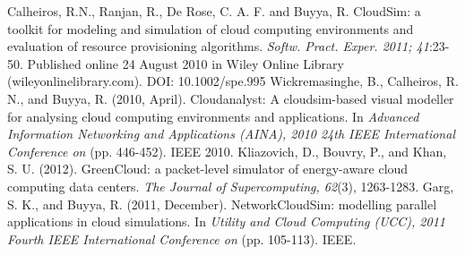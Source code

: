 \documentclass[times, 10pt,twocolumn]{article}
\begin{document}
\begin{thebibliography}{1}
 Calheiros, R.N., Ranjan, R., De Rose, C. A. F. and Buyya, R. CloudSim: a toolkit for modeling and simulation of cloud computing environments and evaluation of resource provisioning algorithms. {\em Softw. Pract. Exper. 2011; 41}:23-50. Published online 24 August 2010 in Wiley Online Library (wileyonlinelibrary.com). DOI: 10.1002/spe.995
 Wickremasinghe, B., Calheiros, R. N., and Buyya, R. (2010, April). Cloudanalyst: A cloudsim-based visual modeller for analysing cloud computing environments and applications. In {\em Advanced Information Networking and Applications (AINA), 2010 24th IEEE International Conference on} (pp. 446-452). IEEE 2010.
 Kliazovich, D., Bouvry, P., and Khan, S. U. (2012). GreenCloud: a packet-level simulator of energy-aware cloud computing data centers. {\em The Journal of Supercomputing, 62}(3), 1263-1283.
 Garg, S. K., and Buyya, R. (2011, December). NetworkCloudSim: modelling parallel applications in cloud simulations. In {\em Utility and Cloud Computing (UCC), 2011 Fourth IEEE International Conference on} (pp. 105-113). IEEE.
\end{thebibliography}
\end{document}
